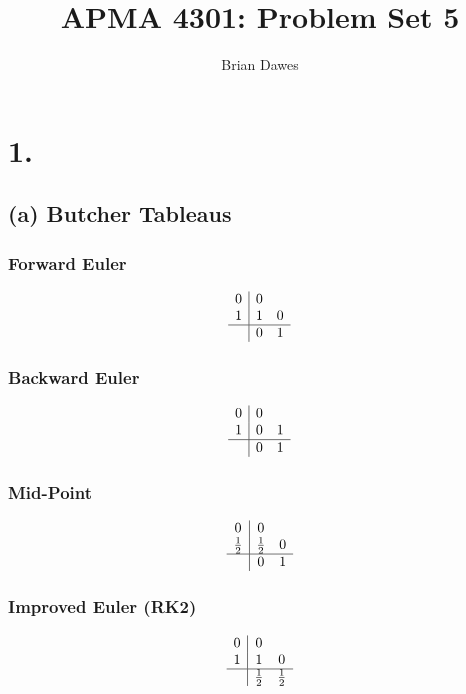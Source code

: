 \documentclass{article}
\begin{document}
\title{APMA 4301: Problem Set 5}
\author{Brian Dawes}
\maketitle

\section*{1.}
\subsection*{(a) Butcher Tableaus}
\renewcommand{\arraystretch}{1.2}
\subsubsection*{Forward Euler}
\begin{equation}
\begin{array}{c|cc}
0 & 0 \\
1 & 1 & 0 \\
\hline
 & 0 & 1
\end{array}
\end{equation}

\subsubsection*{Backward Euler}
\begin{equation}
\begin{array}{c|cc}
0 & 0 \\
1 & 0 & 1 \\
\hline
& 0 & 1
\end{array}
\end{equation}

\subsubsection*{Mid-Point}
\begin{equation}
\begin{array}{c|cc}
0 & 0 \\
\frac{1}{2} & \frac{1}{2} & 0 \\
\hline
& 0 & 1
\end{array}
\end{equation}


\subsubsection*{Improved Euler (RK2)}
\begin{equation}
\begin{array}{c|cc}
0 & 0 \\
1 & 1 & 0 \\
\hline
& \frac{1}{2} & \frac{1}{2}
\end{array}
\end{equation}
\end{document}
